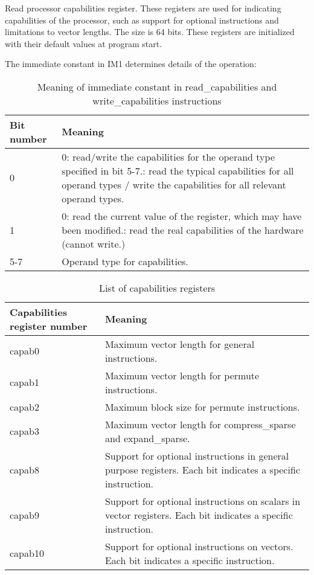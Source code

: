 \documentclass[forwardcom.tex]{subfiles}
\begin{document}
Read processor capabilities register. These registers are used for indicating capabilities of the processor, such as support for optional instructions and limitations to vector lengths. The size is 64 bits. These registers are initialized with their default values at program start.
\vspace{2mm}

The immediate constant in IM1 determines details of the operation:

\begin{longtable} {|p{20mm}|p{90mm}|}
\caption{Meaning of immediate constant in read\_capabilities and write\_capabilities instructions} 
\label{table:readWriteCapabilitiesModes} \\
\endfirsthead
\endhead
\hline
\bfseries Bit number & \bfseries Meaning  \\
\hline
0  &  0: read/write the capabilities for the operand type specified in bit 5-7.\newline
      1: read the typical capabilities for all operand types / write the capabilities for all    
      relevant operand types.  \\
\hline
1  &  0: read the current value of the register, which may have been modified.\newline
      1: read the real capabilities of the hardware (cannot write.) \\
\hline
5-7 & Operand type for capabilities. \\
\hline
\end{longtable}


\begin{longtable} {|p{20mm}|p{90mm}|}
\caption{List of capabilities registers} 
\label{table:capabilitiesRegisters} \\
\endfirsthead
\endhead
\hline
\bfseries Capabilities register number & \bfseries Meaning  \\
\hline
capab0  &  Maximum vector length for general instructions. \\
\hline
capab1  &  Maximum vector length for permute instructions. \\
\hline
capab2  &  Maximum block size for permute instructions. \\
\hline
capab3  &  Maximum vector length for compress\_sparse and expand\_sparse. \\
\hline
capab8  &  Support for optional instructions in general purpose registers. Each bit indicates a specific instruction. \\
\hline
capab9  &  Support for optional instructions on scalars in vector registers. Each bit indicates a specific instruction. \\
\hline
capab10 &  Support for optional instructions on vectors. Each bit indicates a specific instruction. \\
\hline
\end{longtable}
\end{document}
